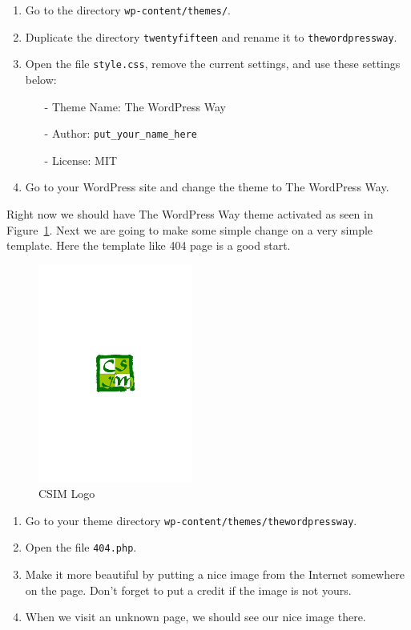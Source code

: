 \documentclass{article}
\begin{document}
\begin{enumerate}
    \item Go to the directory {\tt wp-content/themes/}.
    \item Duplicate the directory {\tt twentyfifteen} and rename it
        to {\tt thewordpressway}.
    \item Open the file {\tt style.css}, remove the current settings, and use
        these settings below:
        \begin{itemize}
            \item[-] Theme Name: The WordPress Way
            \item[-] Author: {\tt put\_your\_name\_here}
            \item[-] License: MIT
        \end{itemize}
    \item Go to your WordPress site and change the theme to The WordPress Way.
\end{enumerate}

\noindent Right now we should have The WordPress Way theme activated as seen in
Figure~\ref{fig:csim-logo}. Next we are going to make some simple change on a
very simple template. Here the template like 404 page is a good start.

\begin{figure}[t]
    \centering
    \includegraphics[width=2in]{figures/csim}
    \caption{CSIM Logo}
    \label{fig:csim-logo}
\end{figure}

\begin{enumerate}
    \item Go to your theme directory {\tt wp-content/themes/thewordpressway}.
    \item Open the file {\tt 404.php}.
    \item Make it more beautiful by putting a nice image from the Internet
        somewhere on the page. Don't forget to put a credit if the image is
        not yours.
    \item When we visit an unknown page, we should see our nice image there.
\end{enumerate}
\end{document}
